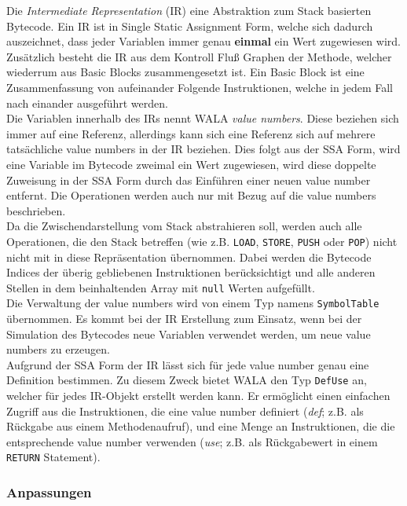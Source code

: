 Die \textit{Intermediate Representation} (IR) eine Abstraktion zum Stack basierten Bytecode. Ein IR ist
in Single Static Assignment Form, welche sich dadurch auszeichnet, dass jeder Variablen immer genau 
\textbf{einmal} ein Wert zugewiesen wird. Zusätzlich besteht die IR aus dem Kontroll Fluß Graphen der 
Methode, welcher wiederrum aus Basic Blocks zusammengesetzt ist. Ein Basic Block ist eine Zusammenfassung 
von aufeinander Folgende Instruktionen, welche in jedem Fall nach einander ausgeführt werden.
\\
Die Variablen innerhalb des IRs nennt WALA \textit{value numbers}. Diese beziehen sich immer auf eine 
Referenz, allerdings kann sich eine Referenz sich auf mehrere tatsächliche value numbers in der IR beziehen.
Dies folgt aus der SSA Form, wird eine Variable im Bytecode zweimal ein Wert zugewiesen, wird diese 
doppelte Zuweisung in der SSA Form durch das Einführen einer neuen value number entfernt. Die Operationen
werden auch nur mit Bezug auf die value numbers beschrieben.   
\\ 
Da die Zwischendarstellung vom Stack abstrahieren soll, werden auch alle Operationen, die den Stack betreffen
(wie z.B. \texttt{LOAD}, \texttt{STORE}, \texttt{PUSH} oder \texttt{POP}) nicht nicht mit in diese 
Repräsentation übernommen. Dabei werden die Bytecode Indices der überig gebliebenen Instruktionen 
berücksichtigt und alle anderen Stellen in dem beinhaltenden Array mit \texttt{null} Werten aufgefüllt.
\\
Die Verwaltung der value numbers wird von einem Typ namens \texttt{SymbolTable} übernommen. Es kommt bei der
IR Erstellung zum Einsatz, wenn bei der Simulation des Bytecodes neue Variablen verwendet werden, um neue 
value numbers zu erzeugen.
\\
Aufgrund der SSA Form der IR lässt sich für jede value number genau eine Definition bestimmen. Zu diesem 
Zweck bietet WALA den Typ \texttt{DefUse} an, welcher für jedes IR-Objekt erstellt werden kann. Er ermöglicht
einen einfachen Zugriff aus die Instruktionen, die eine value number definiert (\textit{def}; z.B. als 
Rückgabe aus einem Methodenaufruf), und eine Menge an Instruktionen, die die entsprechende value number 
verwenden (\textit{use}; z.B. als Rückgabewert in einem \texttt{RETURN} Statement).
\\   


\subsubsection{Anpassungen}

